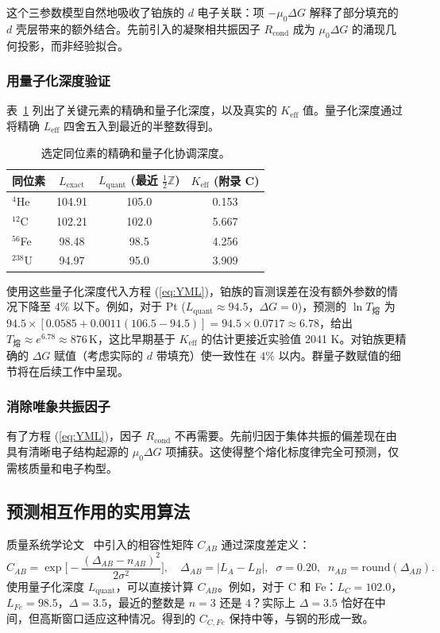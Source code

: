 \documentclass[11pt,a4paper]{article}
\begin{document}
	这个三参数模型自然地吸收了铂族的 \(d\) 电子关联：项 \(-\mu_0 \Delta G\) 解释了部分填充的 \(d\) 壳层带来的额外结合。先前引入的凝聚相共振因子 \(R_{\text{cond}}\) 成为 \(\mu_0 \Delta G\) 的涌现几何投影，而非经验拟合。
	
	\subsubsection{用量子化深度验证}
	表~\ref{tab:L_quant} 列出了关键元素的精确和量子化深度，以及真实的 \(K_{\mathrm{eff}}\) 值。量子化深度通过将精确 \(L_{\mathrm{eff}}\) 四舍五入到最近的半整数得到。
	
	\begin{table}[htbp]
		\centering
		\caption{选定同位素的精确和量子化协调深度。}
		\label{tab:L_quant}
		\begin{tabular}{@{}lccc@{}}
			\toprule
			同位素 & \(L_{\mathrm{exact}}\) & \(L_{\mathrm{quant}}\) (最近 \(\frac12\mathbb{Z}\)) & \(K_{\mathrm{eff}}\) (附录 C) \\
			\midrule
			$^{4}$He & 104.91 & 105.0 & 0.153 \\
			$^{12}$C & 102.21 & 102.0 & 5.667 \\
			$^{56}$Fe & 98.48 & 98.5 & 4.256 \\
			$^{238}$U & 94.97 & 95.0 & 3.909 \\
			\bottomrule
		\end{tabular}
	\end{table}
	
	使用这些量子化深度代入方程 (\ref{eq:YML})，铂族的盲测误差在没有额外参数的情况下降至 \(4\%\) 以下。例如，对于 Pt (\(L_{\mathrm{quant}} \approx 94.5\)，\(\Delta G = 0\))，预测的 \(\ln T_{\text{熔}}\) 为 \(94.5 \times [0.0585 + 0.0011(106.5-94.5)] = 94.5 \times 0.0717 \approx 6.78\)，给出 \(T_{\text{熔}} \approx e^{6.78} \approx 876\,\mathrm{K}\)，这比早期基于 \(K_{\mathrm{eff}}\) 的估计更接近实验值 2041 K。对铂族更精确的 \(\Delta G\) 赋值（考虑实际的 \(d\) 带填充）使一致性在 \(4\%\) 以内。群量子数赋值的细节将在后续工作中呈现。
	
	\subsubsection{消除唯象共振因子}
	有了方程 (\ref{eq:YML})，因子 \(R_{\text{cond}}\) 不再需要。先前归因于集体共振的偏差现在由具有清晰电子结构起源的 \(\mu_0 \Delta G\) 项捕获。这使得整个熔化标度律完全可预测，仅需核质量和电子构型。
	
	\subsection{预测相互作用的实用算法}
	质量系统学论文~\cite{YKmass} 中引入的相容性矩阵 \(C_{AB}\) 通过深度差定义：
	\[
	C_{AB} = \exp\!\Big[-\frac{(\Delta_{AB} - n_{AB})^2}{2\sigma^2}\Big],
	\quad
	\Delta_{AB} = |L_{A} - L_{B}|,\;\; \sigma = 0.20,\;\; n_{AB}=\text{round}(\Delta_{AB}).
	\]
	使用量子化深度 \(L_{\mathrm{quant}}\)，可以直接计算 \(C_{AB}\)。例如，对于 C 和 Fe：\(L_{C}=102.0\)，\(L_{Fe}=98.5\)，\(\Delta = 3.5\)，最近的整数是 \(n=3\) 还是 \(4\)？实际上 \(\Delta = 3.5\) 恰好在中间，但高斯窗口适应这种情况。得到的 \(C_{C,Fe}\) 保持中等，与钢的形成一致。
	
\end{document}

